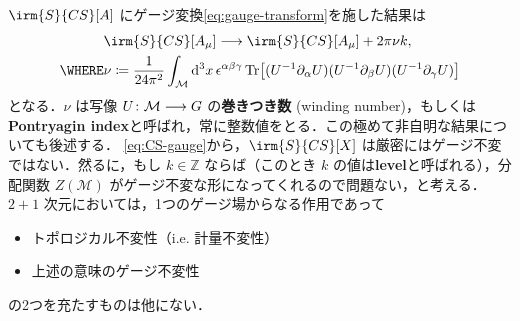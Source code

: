 \documentclass[TQFT_main]{subfiles}
\begin{document}
$\irm{S}{CS}[A]$ にゲージ変換\eqref{eq:gauge-transform}を施した結果は
\begin{align}
    &\irm{S}{CS}[A_\mu] \lto \irm{S}{CS}[A_\mu] + 2\pi \nu k, \label{eq:CS-gauge} \\
    \WHERE &\nu \coloneqq \frac{1}{24 \pi^2} \int_{\mathcal{M}} \dd[3]{x} \epsilon^{\alpha\beta\gamma} \Tr \bigl[ (U^{-1} \partial_\alpha U)(U^{-1} \partial_\beta U)(U^{-1} \partial_\gamma U) \bigr] 
\end{align}
となる．$\nu$ は写像 $U \colon \mathcal{M} \longrightarrow G$ の\textbf{巻きつき数} (winding number)，もしくは\textbf{Pontryagin index}と呼ばれ，常に整数値をとる．この極めて非自明な結果についても後述する．
\eqref{eq:CS-gauge}から，$\irm{S}{CS}[X]$ は厳密にはゲージ不変ではない．然るに，もし $k \in \mathbb{Z}$ ならば（このとき $k$ の値は\textbf{level}と呼ばれる），分配関数 $Z (\mathcal{M})$ がゲージ不変な形になってくれるので問題ない，と考える．
$2+1$ 次元においては，1つのゲージ場からなる作用であって
\begin{itemize}
    \item トポロジカル不変性（i.e. 計量不変性）
    \item 上述の意味のゲージ不変性
\end{itemize}
の2つを充たすものは他にない．


\end{document}
